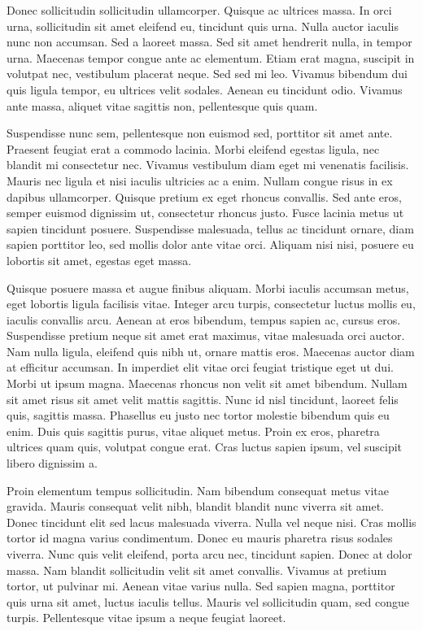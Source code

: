 \documentclass[
  english,
  man,floatsintext]{apa6}
\begin{document}
Donec sollicitudin sollicitudin ullamcorper. Quisque ac ultrices massa. In orci urna, sollicitudin sit amet eleifend eu, tincidunt quis urna. Nulla auctor iaculis nunc non accumsan. Sed a laoreet massa. Sed sit amet hendrerit nulla, in tempor urna. Maecenas tempor congue ante ac elementum. Etiam erat magna, suscipit in volutpat nec, vestibulum placerat neque. Sed sed mi leo. Vivamus bibendum dui quis ligula tempor, eu ultrices velit sodales. Aenean eu tincidunt odio. Vivamus ante massa, aliquet vitae sagittis non, pellentesque quis quam.

Suspendisse nunc sem, pellentesque non euismod sed, porttitor sit amet ante. Praesent feugiat erat a commodo lacinia. Morbi eleifend egestas ligula, nec blandit mi consectetur nec. Vivamus vestibulum diam eget mi venenatis facilisis. Mauris nec ligula et nisi iaculis ultricies ac a enim. Nullam congue risus in ex dapibus ullamcorper. Quisque pretium ex eget rhoncus convallis. Sed ante eros, semper euismod dignissim ut, consectetur rhoncus justo. Fusce lacinia metus ut sapien tincidunt posuere. Suspendisse malesuada, tellus ac tincidunt ornare, diam sapien porttitor leo, sed mollis dolor ante vitae orci. Aliquam nisi nisi, posuere eu lobortis sit amet, egestas eget massa.

Quisque posuere massa et augue finibus aliquam. Morbi iaculis accumsan metus, eget lobortis ligula facilisis vitae. Integer arcu turpis, consectetur luctus mollis eu, iaculis convallis arcu. Aenean at eros bibendum, tempus sapien ac, cursus eros. Suspendisse pretium neque sit amet erat maximus, vitae malesuada orci auctor. Nam nulla ligula, eleifend quis nibh ut, ornare mattis eros. Maecenas auctor diam at efficitur accumsan. In imperdiet elit vitae orci feugiat tristique eget ut dui. Morbi ut ipsum magna. Maecenas rhoncus non velit sit amet bibendum. Nullam sit amet risus sit amet velit mattis sagittis. Nunc id nisl tincidunt, laoreet felis quis, sagittis massa. Phasellus eu justo nec tortor molestie bibendum quis eu enim. Duis quis sagittis purus, vitae aliquet metus. Proin ex eros, pharetra ultrices quam quis, volutpat congue erat. Cras luctus sapien ipsum, vel suscipit libero dignissim a.

Proin elementum tempus sollicitudin. Nam bibendum consequat metus vitae gravida. Mauris consequat velit nibh, blandit blandit nunc viverra sit amet. Donec tincidunt elit sed lacus malesuada viverra. Nulla vel neque nisi. Cras mollis tortor id magna varius condimentum. Donec eu mauris pharetra risus sodales viverra. Nunc quis velit eleifend, porta arcu nec, tincidunt sapien. Donec at dolor massa. Nam blandit sollicitudin velit sit amet convallis. Vivamus at pretium tortor, ut pulvinar mi. Aenean vitae varius nulla. Sed sapien magna, porttitor quis urna sit amet, luctus iaculis tellus. Mauris vel sollicitudin quam, sed congue turpis. Pellentesque vitae ipsum a neque feugiat laoreet.
\end{document}
